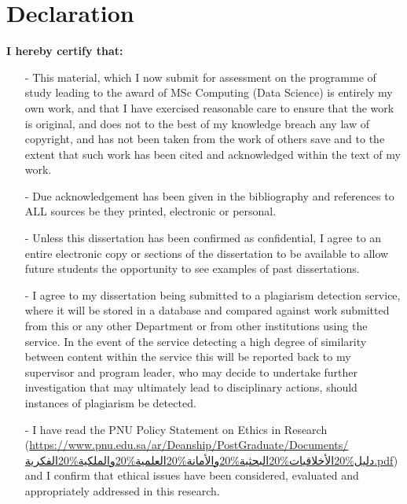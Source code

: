 \documentclass[15pt]{article}
\begin{document}
\begin{spacing}{-2}
\tableofcontents 
\end{spacing}

\newpage

\section*{Declaration}

\noindent
\textbf{I hereby certify that:}

\begin{itemize}
\item[-] This material, which I now submit for assessment on the programme of study leading to the award of MSc Computing (Data Science) is entirely my own work, and that I have exercised reasonable care to ensure that the work is original, and does not to the best of my knowledge breach any law of copyright, and has not been taken from the work of others save and to the extent that such work has been cited and acknowledged within the text of my work.
\item[-] Due acknowledgement has been given in the bibliography and references to ALL sources be they printed, electronic or personal.
\item[-] Unless this dissertation has been confirmed as confidential, I agree to an entire electronic copy or sections of the dissertation to be available to allow future students the opportunity to see examples of past dissertations.
\item[-] I agree to my dissertation being submitted to a plagiarism detection service, where it will be stored in a database and compared against work submitted from this or any other Department or from other institutions using the service. In the event of the service detecting a high degree of similarity between content within the service this will be reported back to my supervisor and program leader, who may decide to undertake further investigation that may ultimately lead to disciplinary actions, should instances of plagiarism be detected.
\item[-] I have read the PNU Policy Statement on Ethics in Research (\url{https://www.pnu.edu.sa/ar/Deanship/PostGraduate/Documents/دليل%20الأخلاقيات%20البحثية%20والأمانة%20العلمية%20والملكية%20الفكرية.pdf}) and I confirm that ethical issues have been considered, evaluated and appropriately addressed in this research.
\end{itemize}

\vspace{1cm}
\end{document}
